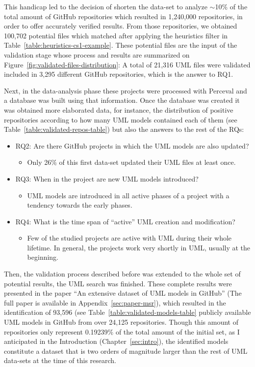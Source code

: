 \documentclass[a4paper, 12pt]{book}
\begin{document}
This handicap led to the decision of shorten the data-set to analyze $\sim$10\% of the total amount of GitHub repositories which resulted
in 1,240,000 repositories, in order to offer accurately verified results. From those repositories, we obtained 100,702 potential files
which matched after applying the heuristics filter in Table~\ref{table:heuristics-cs1-example}. These potential files are the input
of the validation stage whose process and results are summarized on Figure~\ref{fig:validated-files-distribution}: A total of 21,316 UML
files were validated included in 3,295 different GitHub repositories, which is the answer to RQ1.

Next, in the data-analysis phase these projects were processed with Perceval and a database was built using that information.
Once the database was created it was obtained more elaborated data, for instance, the distribution of positive repositories
according to how many UML models contained each of them (see Table~\ref{table:validated-repos-table}) but also the answers to the rest
of the RQs:

\begin{itemize}
  \item RQ2: Are there GitHub projects in which the UML models are also updated?
  \begin{itemize}
    \item Only 26\% of this first data-set updated their UML files at least once.
  \end{itemize}
  \item RQ3: When in the project are new UML models introduced?
  \begin{itemize}
    \item UML models are introduced in all active phases of a project with a tendency towards the early phases.
  \end{itemize}
  \item RQ4: What is the time span of ``active'' UML creation and modification?
  \begin{itemize}
    \item Few of the studied projects are active with UML during their whole lifetime.
    In general, the projects work very shortly in UML, usually at the beginning.
  \end{itemize}
\end{itemize}

Then, the validation process described before was extended to the whole set of potential results, the UML search was finished.
These complete results were presented in the paper ``An extensive dataset of UML models in GitHub'' (The full paper is available in Appendix~\ref{sec:paper-msr}),
which resulted in the identification of 93,596 (see Table~\ref{table:validated-models-table} publicly available UML models
in GitHub from over 24,125 repositories. Though this amount of repositories only represent 0.19239\% of the total amount of the initial set,
as I anticipated in the Introduction (Chapter~\ref{sec:intro}), the identified models constitute a dataset that is two orders of magnitude larger than the
rest of UML data-sets at the time of this research.
\end{document}
